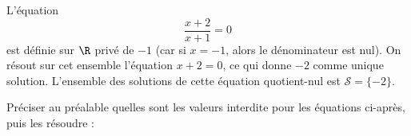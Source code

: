 \documentclass{exam}
\begin{document}
\begin{example}
L'équation
\begin{equation*}
\dfrac{x+2}{x+1} = 0
\end{equation*}
est définie sur $\R$ privé de $-1$ (car si $x = -1$, alors le dénominateur est nul). On résout sur cet ensemble l'équation $x+2=0$, ce qui donne $-2$ comme unique solution. L'ensemble des solutions de cette équation quotient-nul est $\mathcal{S}=\{-2\}$.
\end{example}
\begin{questions}
\question Préciser au préalable quelles sont les valeurs interdite pour les équations ci-après, puis les résoudre :
\makeemptybox{10cm}
\end{questions}
\end{document}
